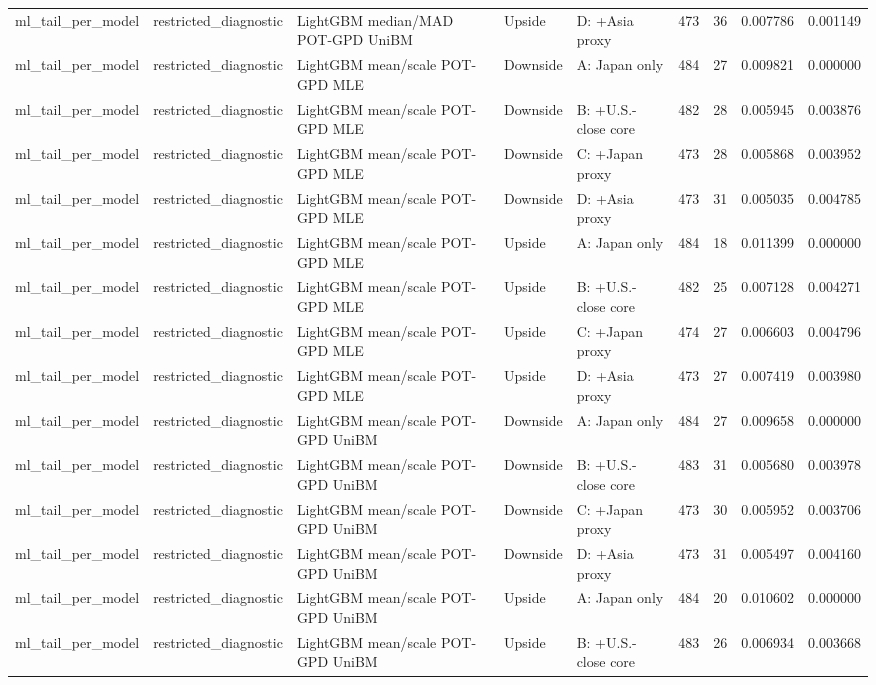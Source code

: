 \begin{tabular}{lllllrrrr}
ml\_tail\_per\_model & restricted\_diagnostic & LightGBM median/MAD POT-GPD UniBM & Upside & D: +Asia proxy & 473 & 36 & 0.007786 & 0.001149 \\
ml\_tail\_per\_model & restricted\_diagnostic & LightGBM mean/scale POT-GPD MLE & Downside & A: Japan only & 484 & 27 & 0.009821 & 0.000000 \\
ml\_tail\_per\_model & restricted\_diagnostic & LightGBM mean/scale POT-GPD MLE & Downside & B: +U.S.-close core & 482 & 28 & 0.005945 & 0.003876 \\
ml\_tail\_per\_model & restricted\_diagnostic & LightGBM mean/scale POT-GPD MLE & Downside & C: +Japan proxy & 473 & 28 & 0.005868 & 0.003952 \\
ml\_tail\_per\_model & restricted\_diagnostic & LightGBM mean/scale POT-GPD MLE & Downside & D: +Asia proxy & 473 & 31 & 0.005035 & 0.004785 \\
ml\_tail\_per\_model & restricted\_diagnostic & LightGBM mean/scale POT-GPD MLE & Upside & A: Japan only & 484 & 18 & 0.011399 & 0.000000 \\
ml\_tail\_per\_model & restricted\_diagnostic & LightGBM mean/scale POT-GPD MLE & Upside & B: +U.S.-close core & 482 & 25 & 0.007128 & 0.004271 \\
ml\_tail\_per\_model & restricted\_diagnostic & LightGBM mean/scale POT-GPD MLE & Upside & C: +Japan proxy & 474 & 27 & 0.006603 & 0.004796 \\
ml\_tail\_per\_model & restricted\_diagnostic & LightGBM mean/scale POT-GPD MLE & Upside & D: +Asia proxy & 473 & 27 & 0.007419 & 0.003980 \\
ml\_tail\_per\_model & restricted\_diagnostic & LightGBM mean/scale POT-GPD UniBM & Downside & A: Japan only & 484 & 27 & 0.009658 & 0.000000 \\
ml\_tail\_per\_model & restricted\_diagnostic & LightGBM mean/scale POT-GPD UniBM & Downside & B: +U.S.-close core & 483 & 31 & 0.005680 & 0.003978 \\
ml\_tail\_per\_model & restricted\_diagnostic & LightGBM mean/scale POT-GPD UniBM & Downside & C: +Japan proxy & 473 & 30 & 0.005952 & 0.003706 \\
ml\_tail\_per\_model & restricted\_diagnostic & LightGBM mean/scale POT-GPD UniBM & Downside & D: +Asia proxy & 473 & 31 & 0.005497 & 0.004160 \\
ml\_tail\_per\_model & restricted\_diagnostic & LightGBM mean/scale POT-GPD UniBM & Upside & A: Japan only & 484 & 20 & 0.010602 & 0.000000 \\
ml\_tail\_per\_model & restricted\_diagnostic & LightGBM mean/scale POT-GPD UniBM & Upside & B: +U.S.-close core & 483 & 26 & 0.006934 & 0.003668 \\

\end{tabular}
